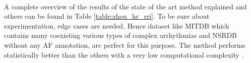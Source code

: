 \\
A complete overview of the results of the state of the art method explained and others can be found in Table \ref{table:zhou_hr_rri}.
To be sure about experimentation, edge cases are needed. Hence dataset like MITDB which contains many coexisting various types of complex arrhythmias and NSRDB without any AF annotation, are perfect for this purpose. The method performs statistically better than the others \cite[p. 11]{zhou2015} with a very low computational complexity \cite[p. 14]{zhou2015}.

\blankpage